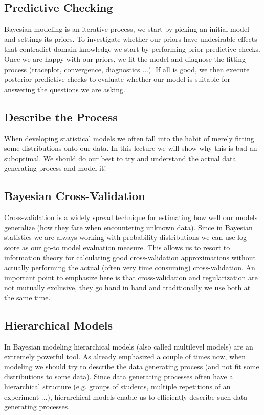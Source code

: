 \documentclass[fleqn,moreauthors,10pt]{ds_report}
\begin{document}
\subsection*{Predictive Checking}

Bayesian modeling is an iterative process, we start by picking an initial model and settings its priors. To investigate whether our priors have undesirable effects that contradict domain knowledge we start by performing prior predictive checks. Once we are happy with our priors, we fit the model and diagnose the fitting process (traceplot, convergence, diagnostics ...). If all is good, we then execute posterior predictive checks to evaluate whether our model is suitable for answering the questions we are asking.


\subsection*{Describe the Process}

When developing statistical models we often fall into the habit of merely fitting some distributions onto our data. In this lecture we will show why this is bad an suboptimal. We should do our best to try and understand the actual data generating process and model it!

\subsection*{Bayesian Cross-Validation}

Cross-validation is a widely spread technique for estimating how well our models generalize (how they fare when encountering unknown data). Since in Bayesian statistics we are always working with probability distributions we can use log-score as our go-to model evaluation measure. This allows us to resort to information theory for calculating good cross-validation approximations without actually performing the actual (often very time consuming) cross-validation. An important point to emphasize here is that cross-validation and regularization are not mutually exclusive, they go hand in hand and traditionally we use both at the same time.

\subsection*{Hierarchical Models}

In Bayesian modeling hierarchical models (also called multilevel models) are an extremely powerful tool. As already emphasized a couple of times now, when modeling we should try to describe the data generating process (and not fit some distributions to some data). Since data generating processes often have a hierarchical structure (e.g. groups of students, multiple repetitions of an experiment ...), hierarchical models enable us to efficiently describe such data generating processes.
\end{document}
